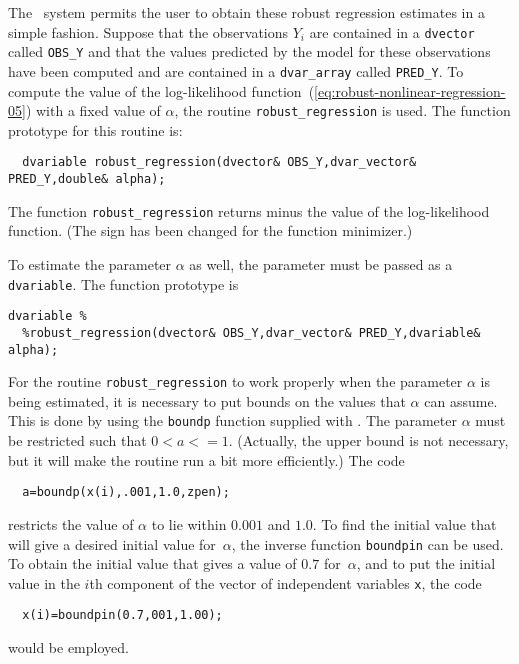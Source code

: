 \documentclass{admbmanual}
\begin{document}
The \scAD\ system permits the user to obtain these robust regression estimates
in a simple fashion. Suppose that the observations $Y_i$ are contained in a
\texttt{dvector} called \texttt{OBS\_Y} and that the values predicted by the
model for these observations have been computed and are contained in a
\texttt{dvar\_array} called \texttt{PRED\_Y}. To compute the value of the
log-likelihood
function~(\ref{eq:robust-nonlinear-regression-05}) %
with a fixed value of $\alpha$, the routine \texttt{robust\_regression} is used.
The function prototype for this routine is:
\begin{lstlisting}
  dvariable robust_regression(dvector& OBS_Y,dvar_vector& PRED_Y,double& alpha);
\end{lstlisting}
The function \texttt{robust\_regression} returns minus the value of the
log-likelihood function. (The sign has been changed for the function minimizer.)
\begin{figure}
  \centering\hskip1pt
   
   \emptycaption{}
   \label{fig:robust-nonlinear-regression-01} %
\end{figure}

To estimate the parameter $\alpha$ as well, the parameter must be passed as a
\texttt{dvariable}. The function prototype is
\begin{lstlisting}[escapechar=\%]
  dvariable %
  %robust_regression(dvector& OBS_Y,dvar_vector& PRED_Y,dvariable& alpha);
\end{lstlisting}

For the routine \texttt{robust\_regression} to work properly when the parameter
$\alpha$ is being estimated, it is necessary to put bounds on the values that
$\alpha$ can assume. This is done by using the \texttt{boundp} function supplied
with \scAD. The parameter $\alpha$ must be restricted such that $0<a<=1$.
(Actually, the upper bound is not necessary, but it will make the routine run a
bit more efficiently.) The code
\begin{lstlisting}
  a=boundp(x(i),.001,1.0,zpen);
\end{lstlisting}
restricts the value of $\alpha$ to lie within $0.001$ and $1.0$. To find the
initial value that will give a desired initial value for~$\alpha$, the inverse
function \texttt{boundpin} can be used. To obtain the initial value that gives a
value of $0.7$ for~$\alpha$, and to put the initial value in the $i$th component
of the vector of independent variables \texttt{x}, the code
\begin{lstlisting}
  x(i)=boundpin(0.7,001,1.00);
\end{lstlisting}
would be employed.
\end{document}
